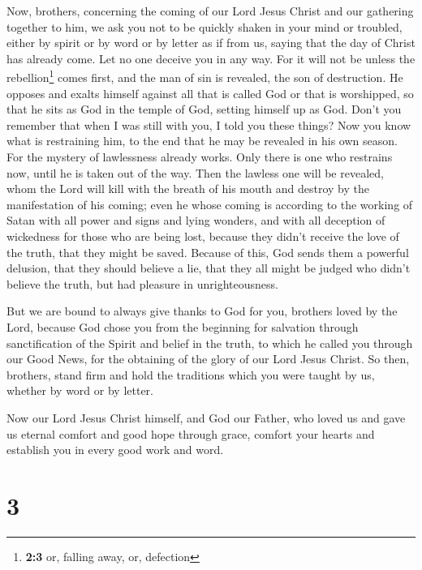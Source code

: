  Now, brothers, concerning the coming of our Lord Jesus
Christ and our gathering together to him, we ask you  not
to be quickly shaken in your mind or troubled, either by spirit or by
word or by letter as if from us, saying that the day of Christ has
already come.  Let no one deceive you in any way. For it
will not be unless the rebellion\footnote{\textbf{2:3} or, falling away,
  or, defection} comes first, and the man of sin is revealed, the son of
destruction.  He opposes and exalts himself against all
that is called God or that is worshipped, so that he sits as God in the
temple of God, setting himself up as God.  Don't you
remember that when I was still with you, I told you these things?
 Now you know what is restraining him, to the end that he
may be revealed in his own season.  For the mystery of
lawlessness already works. Only there is one who restrains now, until he
is taken out of the way.  Then the lawless one will be
revealed, whom the Lord will kill with the breath of his mouth and
destroy by the manifestation of his coming;  even he whose
coming is according to the working of Satan with all power and signs and
lying wonders,  and with all deception of wickedness for
those who are being lost, because they didn't receive the love of the
truth, that they might be saved.  Because of this, God
sends them a powerful delusion, that they should believe a lie,
 that they all might be judged who didn't believe the
truth, but had pleasure in unrighteousness.

 But we are bound to always give thanks to God for you,
brothers loved by the Lord, because God chose you from the beginning for
salvation through sanctification of the Spirit and belief in the truth,
 to which he called you through our Good News, for the
obtaining of the glory of our Lord Jesus Christ.  So
then, brothers, stand firm and hold the traditions which you were taught
by us, whether by word or by letter.

 Now our Lord Jesus Christ himself, and God our Father,
who loved us and gave us eternal comfort and good hope through grace,
 comfort your hearts and establish you in every good work
and word.

\hypertarget{section-2}{%
\section{3}\label{section-2}}

